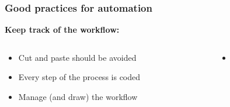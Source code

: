 \documentclass[xcolor=x11names,compress]{beamer}
\renewcommand{\(}{\begin{columns}}
\renewcommand{\)}{\end{columns}}
\newcommand{\<}[1]{\begin{column}{#1}}
\renewcommand{\>}{\end{column}}
\begin{document}
\begin{frame}
\frametitle{\textbf{Good practices for automation} }
\textcolor{siap}{\textbf{Keep track of the workflow:} \\  }
 \begin{columns}[t]
 \begin{column}{0.5\textwidth}
    \begin{itemize}[<+->]
     \item Cut and paste should be avoided
     \item Every step of the process is coded
     \item Manage (and draw) the workflow
   \end{itemize}
  \end{column}
 \begin{column}{0.5\textwidth}
    \begin{itemize}
        \item[]
    \end{itemize}
  \end{column}
\end{columns}
\end{frame}
\end{document}
